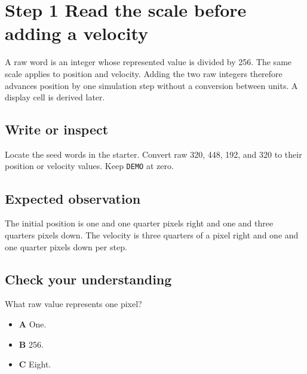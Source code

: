 \section{Step 1 Read the scale before adding a velocity}\label{ball-s01}

A raw word is an integer whose represented value is divided by 256. The same scale applies to position and velocity. Adding the two raw integers therefore advances position by one simulation step without a conversion between units. A display cell is derived later.

\subsection{Write or inspect}
Locate the seed words in the starter. Convert raw 320, 448, 192, and 320 to their position or velocity values. Keep \texttt{DEMO} at zero.

\subsection{Expected observation}
The initial position is one and one quarter pixels right and one and three quarters pixels down. The velocity is three quarters of a pixel right and one and one quarter pixels down per step.

\subsection{Check your understanding}
What raw value represents one pixel?

\begin{itemize}
  \item \textbf{A} One.
  \item \textbf{B} 256.
  \item \textbf{C} Eight.
\end{itemize}
